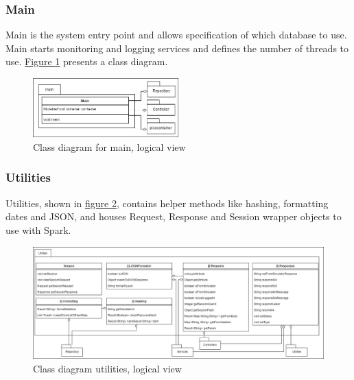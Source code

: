\subsubsection{Main}
Main is the system entry point and allows specification of which database to use. Main starts monitoring and logging services and defines the number of threads to use. \hyperref[fig:classDiagramMain]{Figure \ref{fig:classDiagramMain}} presents a class diagram. 
\begin{figure}[H]
    \centering
    \includegraphics[width=0.5\textwidth]{images/class_diagram_main.jpg}
    \caption{Class diagram for main, logical view}
    \label{fig:classDiagramMain}
\end{figure}

\subsubsection{Utilities}
Utilities, shown in \hyperref[fig:classDiagramUtilities]{figure \ref{fig:classDiagramUtilities}}, contains helper methods like hashing, formatting dates and JSON, and houses Request, Response and Session wrapper objects to use with Spark.
\begin{figure}[H]
    \centering
    \includegraphics[width=1.0\textwidth]{images/class_diagram_utilities.jpg}
    \caption{Class diagram utilities, logical view}
    \label{fig:classDiagramUtilities}
\end{figure}

